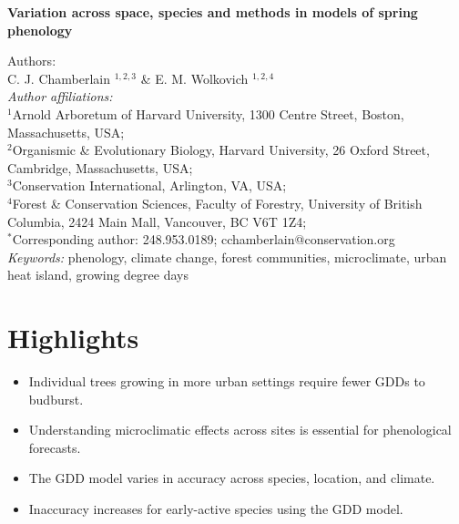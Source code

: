 \documentclass{article}\usepackage[]{graphicx}\usepackage[]{color}
\begin{document}
\noindent\textbf{\Large{Variation across space, species and methods in models of spring phenology}}

\noindent Authors:\\
C. J. Chamberlain $^{1,2,3}$ \& E. M. Wolkovich $^{1,2,4}$
\vspace{2ex}\\
\emph{Author affiliations:}\\
$^{1}$Arnold Arboretum of Harvard University, 1300 Centre Street, Boston, Massachusetts, USA; \\
$^{2}$Organismic \& Evolutionary Biology, Harvard University, 26 Oxford Street, Cambridge, Massachusetts, USA; \\
$^{3}$Conservation International, Arlington, VA, USA;\\
$^{4}$Forest \& Conservation Sciences, Faculty of Forestry, University of British Columbia, 2424 Main Mall, Vancouver, BC V6T 1Z4;\\
\vspace{2ex}
$^*$Corresponding author: 248.953.0189; cchamberlain@conservation.org\\

\noindent \emph{Keywords:} phenology, climate change, forest communities, microclimate, urban heat island, growing degree days\\

\renewcommand{\thetable}{\arabic{table}}
\renewcommand{\thefigure}{\arabic{figure}}
\renewcommand{\labelitemi}{$-$}



\newpage
\section*{Highlights}
\begin{itemize}
\item Individual trees growing in more urban settings require fewer GDDs to budburst.
\item Understanding microclimatic effects across sites is essential for phenological forecasts. 
\item The GDD model varies in accuracy across species, location, and climate. 
\item Inaccuracy increases for early-active species using the GDD model. 
\end{itemize}
\end{document}
